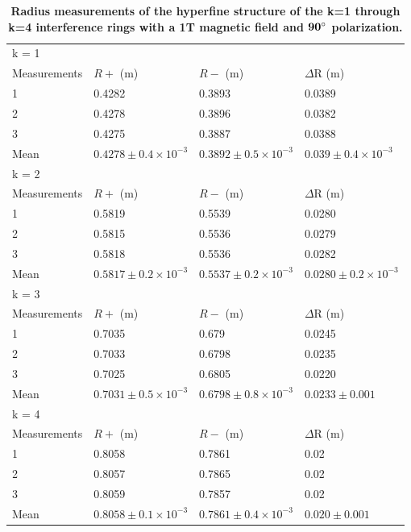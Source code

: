 \documentclass[twocolumn]{article}
\begin{document}
			\begin{table}[]
				\centering
				\begin{tabular}{l|lll}
					k = 1 & & & \\
					Measurements & $R+$ (m) & $R-$ (m)  & $\Delta$R (m) \\ \hline
					1         & 0.4282 & 0.3893  & 0.0389 \\
					2         & 0.4278 & 0.3896  & 0.0382 \\
					3         & 0.4275 & 0.3887  & 0.0388 \\
					Mean      & $0.4278\pm0.4\times10^{-3}$       & $0.3892\pm0.5\times10^{-3}$        & $0.039\pm0.4\times10^{-3}$ \\ \hline
					k = 2 & & & \\
					Measurements & $R+$ (m) & $R-$ (m)  & $\Delta$R (m) \\ \hline
					1           & 0.5819 & 0.5539 & 0.0280 \\
					2           & 0.5815 & 0.5536 & 0.0279 \\
					3           & 0.5818 & 0.5536 & 0.0282 \\
					Mean        & $0.5817\pm0.2\times10^{-3}$ & $0.5537\pm0.2\times10^{-3}$ & $0.0280\pm0.2\times10^{-3}$ \\ \hline
					k = 3 & & & \\
					Measurements & $R+$ (m) & $R-$ (m)  & $\Delta$R (m) \\ \hline
					1    & 0.7035 & 0.679  & 0.0245 \\
					2    & 0.7033 & 0.6798 & 0.0235 \\
					3    & 0.7025 & 0.6805 & 0.0220 \\
					Mean & $0.7031\pm0.5\times10^{-3}$ & $0.6798\pm0.8\times10^{-3}$ & $0.0233\pm0.001$ \\ \hline
					k = 4 & & & \\
					Measurements & $R+$ (m) & $R-$ (m)  & $\Delta$R (m) \\ \hline
					1    & 0.8058 & 0.7861 & 0.02  \\
					2    & 0.8057 & 0.7865 & 0.02  \\
					3    & 0.8059 & 0.7857 & 0.02  \\
					Mean & $0.8058\pm0.1\times10^{-3}$ & $0.7861\pm0.4\times10^{-3}$ & $0.020\pm0.001$
				\end{tabular}
				
				
				\caption{\textbf{Radius measurements of the hyperfine structure of the k=1 through k=4 interference rings with a 1T magnetic field and $\mathbf{90\degree}$ polarization.}}
				\label{my-label}
			\end{table}
			
\end{document}
